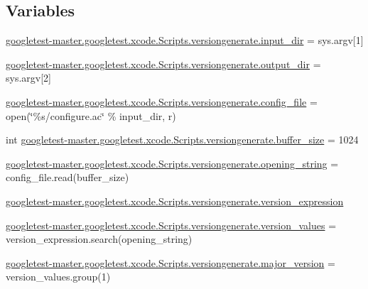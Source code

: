\subsection*{Variables}
\begin{DoxyCompactItemize}
\item 
\mbox{\hyperlink{namespacegoogletest-master_1_1googletest_1_1xcode_1_1_scripts_1_1versiongenerate_aad54ebc7b97c4470cd2909b8b1e64f04}{googletest-\/master.\+googletest.\+xcode.\+Scripts.\+versiongenerate.\+input\+\_\+dir}} = sys.\+argv\mbox{[}1\mbox{]}
\item 
\mbox{\hyperlink{namespacegoogletest-master_1_1googletest_1_1xcode_1_1_scripts_1_1versiongenerate_ae5cb033e11d85bd6958fb632ea0a90e1}{googletest-\/master.\+googletest.\+xcode.\+Scripts.\+versiongenerate.\+output\+\_\+dir}} = sys.\+argv\mbox{[}2\mbox{]}
\item 
\mbox{\hyperlink{namespacegoogletest-master_1_1googletest_1_1xcode_1_1_scripts_1_1versiongenerate_a2f37f17d0275f802f955fd2f49e13f9d}{googletest-\/master.\+googletest.\+xcode.\+Scripts.\+versiongenerate.\+config\+\_\+file}} = open(\char`\"{}\%s/configure.\+ac\char`\"{} \% input\+\_\+dir, \textquotesingle{}r\textquotesingle{})
\item 
int \mbox{\hyperlink{namespacegoogletest-master_1_1googletest_1_1xcode_1_1_scripts_1_1versiongenerate_a84162d104e9a0426bb747ca62fac346f}{googletest-\/master.\+googletest.\+xcode.\+Scripts.\+versiongenerate.\+buffer\+\_\+size}} = 1024
\item 
\mbox{\hyperlink{namespacegoogletest-master_1_1googletest_1_1xcode_1_1_scripts_1_1versiongenerate_a2f1e107ea3b6d23c6373ad9b4704e8be}{googletest-\/master.\+googletest.\+xcode.\+Scripts.\+versiongenerate.\+opening\+\_\+string}} = config\+\_\+file.\+read(buffer\+\_\+size)
\item 
\mbox{\hyperlink{namespacegoogletest-master_1_1googletest_1_1xcode_1_1_scripts_1_1versiongenerate_a8634acf78b3d63d86af57f0f26f54fbc}{googletest-\/master.\+googletest.\+xcode.\+Scripts.\+versiongenerate.\+version\+\_\+expression}}
\item 
\mbox{\hyperlink{namespacegoogletest-master_1_1googletest_1_1xcode_1_1_scripts_1_1versiongenerate_af52deb41272385600c5b464ee5d8d0ed}{googletest-\/master.\+googletest.\+xcode.\+Scripts.\+versiongenerate.\+version\+\_\+values}} = version\+\_\+expression.\+search(opening\+\_\+string)
\item 
\mbox{\hyperlink{namespacegoogletest-master_1_1googletest_1_1xcode_1_1_scripts_1_1versiongenerate_aa282013fe0422c36c685288c3d6e8077}{googletest-\/master.\+googletest.\+xcode.\+Scripts.\+versiongenerate.\+major\+\_\+version}} = version\+\_\+values.\+group(1)

\end{DoxyCompactItemize}
